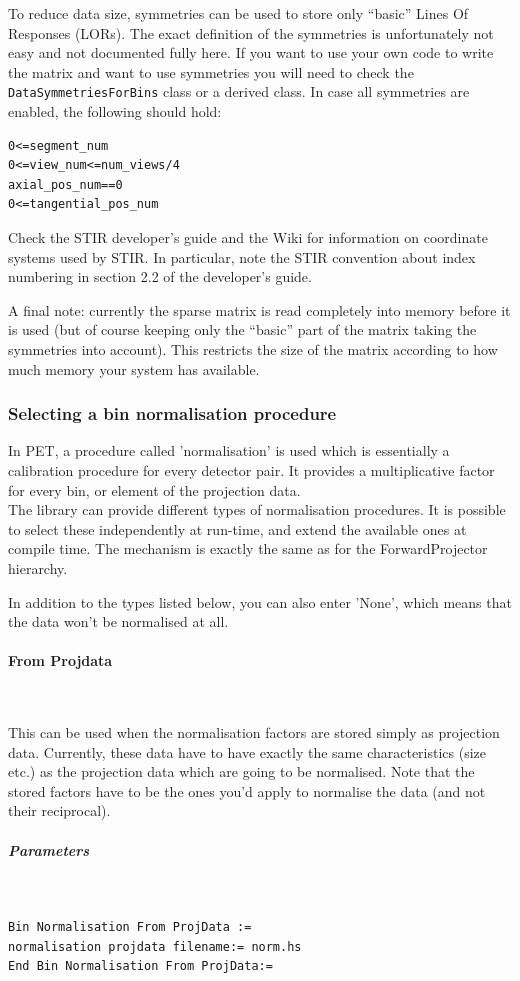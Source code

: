 \documentclass{article}
\newcommand{\subsubsubsection}[1]{\paragraph{#1}\mbox{} \\}
\newcommand{\subsubsubsubsection}[1]{\subparagraph{#1} \mbox{} \\}
\begin{document}
{{{{{{To reduce data size, symmetries can be used to store only ``basic'' Lines Of Responses (LORs). 
The exact definition of the symmetries is unfortunately
not easy and not documented fully here. If you want to use your own code to write the matrix and want to use
symmetries you will need to check the \texttt{DataSymmetriesForBins} class or a derived class. In case all
symmetries are enabled, the following should hold:
\begin{verbatim}
0<=segment_num
0<=view_num<=num_views/4
axial_pos_num==0
0<=tangential_pos_num
\end{verbatim}
Check the STIR developer's guide and the Wiki for information on coordinate systems used by STIR. In particular,
note the STIR convention about index numbering in section 2.2 of the developer's guide.

A final note: currently the sparse matrix is read completely into memory before it is used (but of course
keeping only the ``basic'' part of the matrix taking the symmetries into account). This restricts the size
of the matrix according to how much memory your system has available.

\subsubsection{
Selecting a bin normalisation procedure}
\label{sec:binnormalisation}
In PET, a procedure called 'normalisation' is used which is essentially 
a calibration procedure for every detector pair. It provides 
a multiplicative factor for every bin, or element of the projection 
data.\\
The library can provide different types of normalisation procedures. 
It is possible to select these independently at run-time, and 
extend the available ones at compile time. The mechanism is exactly 
the same as for the ForwardProjector hierarchy.


In addition to the types listed below, you can also enter 'None', 
which means that the data won't be normalised at all.

{ \subsubsubsection{From Projdata}
}\label{sec:binnormalisationFromProjData}
This can be used when the normalisation factors are stored simply 
as projection data. Currently, these data have to have exactly 
the same characteristics (size etc.) as the projection data which 
are going to be normalised. Note that the stored factors have 
to be the ones you'd apply to normalise the data (and not their 
reciprocal).

{ \subsubsubsubsection{Parameters}
}
\begin{verbatim}
Bin Normalisation From ProjData :=
normalisation projdata filename:= norm.hs
End Bin Normalisation From ProjData:=
\end{verbatim}

}}}}}}
\end{document}
